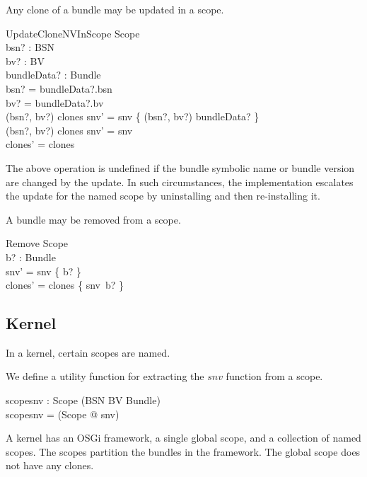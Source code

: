 \documentclass[a4paper,12pt]{article}
\begin{document}
Any clone of a bundle may be updated in a scope.
\begin{schema}{UpdateCloneNVInScope}
\Delta Scope \\
bsn? : BSN \\
bv? : BV \\
bundleData? : Bundle \\
\where
bsn? = bundleData?.bsn \\
bv? = bundleData?.bv \\
(bsn?, bv?) \in clones \implies snv' = snv \oplus \{ (bsn?, bv?) \mapsto bundleData? \} \\
(bsn?, bv?) \notin clones \implies snv' = snv \\
clones' = clones \\
\end{schema}
The above operation is undefined if the bundle symbolic name or bundle version are changed by the update.
In such circumstances, the implementation escalates the update for the named scope by
uninstalling and then re-installing it.

A bundle may be removed from a scope.
\begin{schema}{Remove}
\Delta Scope \\
b? : Bundle \\
\where
snv' = snv \nrres \{ b? \} \\
clones' = clones \setminus \{ snv\inv~b? \} \\
\end{schema}

\subsection{Kernel}

In a kernel, certain scopes are named.
\begin{zed}
[ScopeName]
\end{zed}

We define a utility function for extracting the $snv$ function from a scope.
\begin{axdef}
scopesnv : Scope \fun (BSN \cross BV \pinj Bundle) \\
\where
scopesnv = (\lambda  Scope @ snv) \\
\end{axdef}

A kernel has an OSGi framework, a single global scope, and a collection of named scopes.
The scopes partition the bundles in the framework.
The global scope does not have any clones.
\end{document}
